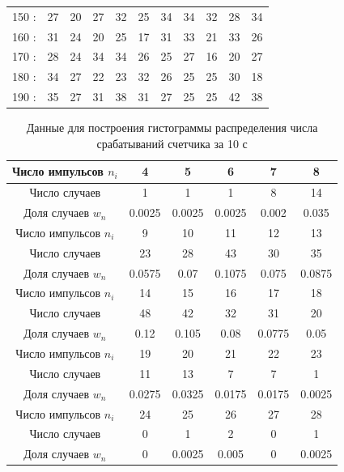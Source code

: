\documentclass[a4paper,12pt]{article} %
\begin{document}
\begin{table}
\begin{tabular}{|c|c|c|c|c|c|c|c|c|c|c|}
150 : & 27 & 20 & 27 & 32 & 25 & 34 & 34 & 32 & 28 & 34 \\ 

160 : & 31 & 24 & 20 & 25 & 17 & 31 & 33 & 21 & 33 & 26 \\ 

170 : & 28 & 24 & 34 & 34 & 26 & 25 & 27 & 16 & 20 & 27 \\ 

180 : & 34 & 27 & 22 & 23 & 32 & 26 & 25 & 25 & 30 & 18 \\ 

190 : & 35 & 27 & 31 & 38 & 31 & 27 & 25 & 25 & 42 & 38 \\ 

\hline 
\end{tabular} 
\end{table}


\begin{table}
\caption{Данные для построения гистограммы распределения числа срабатываний счетчика за 10 с} \label{10c}
\begin{tabular}{|c|c|c|c|c|c|}
\hline 
Число импульсов $n_i$ & 4 & 5 & 6 & 7 & 8 \\ 
\hline 
Число случаев & 1 & 1 & 1 & 8 & 14 \\ 
\hline 
Доля случаев $w_n$ & 0.0025 & 0.0025 & 0.0025 & 0.002 & 0.035 \\ 
\hline 
\hline 
Число импульсов $n_i$ & 9 & 10 & 11 & 12 & 13 \\ 
\hline 
Число случаев & 23 & 28 & 43 & 30 & 35 \\ 
\hline 
Доля случаев $w_n$ & 0.0575 & 0.07 & 0.1075 & 0.075 & 0.0875 \\ 
\hline 
\hline 
Число импульсов $n_i$ & 14 & 15 & 16 & 17 & 18 \\ 
\hline 
Число случаев & 48 & 42 & 32 & 31 & 20 \\ 
\hline 
Доля случаев $w_n$ & 0.12 & 0.105 & 0.08 & 0.0775 & 0.05 \\ 
\hline 
\hline 
Число импульсов $n_i$ & 19 & 20 & 21 & 22 & 23 \\ 
\hline 
Число случаев & 11 & 13 & 7 & 7 & 1 \\ 
\hline 
Доля случаев $w_n$ & 0.0275 & 0.0325 & 0.0175 & 0.0175 & 0.0025 \\ 
\hline 
\hline 
Число импульсов $n_i$ & 24 & 25 & 26 & 27 & 28\\ 
\hline 
Число случаев & 0 & 1 & 2 & 0 & 1\\ 
\hline 
Доля случаев $w_n$ & 0 & 0.0025 & 0.005 & 0 & 0.0025\\ 
\hline 

\end{tabular} 
\end{table}
\end{document}
